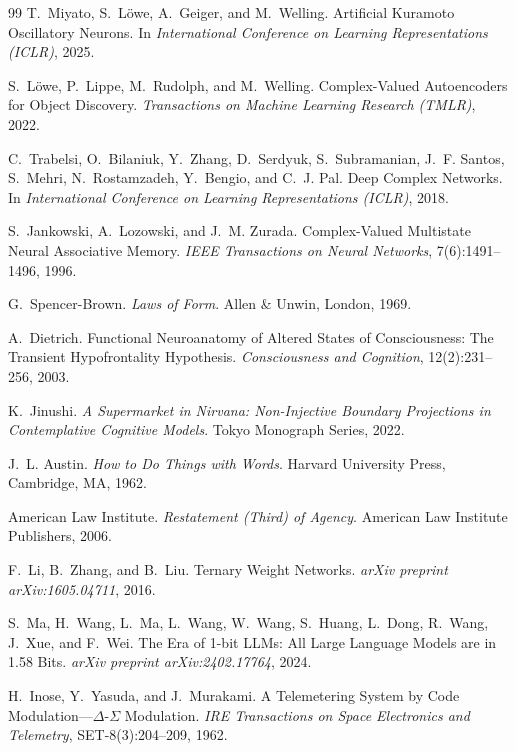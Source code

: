 \documentclass[10pt, twocolumn, a4paper]{article}
\begin{document}
\begin{thebibliography}{99}
T.~Miyato, S.~L{\"o}we, A.~Geiger, and M.~Welling.
\newblock Artificial Kuramoto Oscillatory Neurons.
\newblock In \emph{International Conference on Learning Representations (ICLR)}, 2025.

S.~L{\"o}we, P.~Lippe, M.~Rudolph, and M.~Welling.
\newblock Complex-Valued Autoencoders for Object Discovery.
\newblock \emph{Transactions on Machine Learning Research (TMLR)}, 2022.

C.~Trabelsi, O.~Bilaniuk, Y.~Zhang, D.~Serdyuk, S.~Subramanian, J.~F. Santos, S.~Mehri, N.~Rostamzadeh, Y.~Bengio, and C.~J. Pal.
\newblock Deep Complex Networks.
\newblock In \emph{International Conference on Learning Representations (ICLR)}, 2018.

S.~Jankowski, A.~Lozowski, and J.~M. Zurada.
\newblock Complex-Valued Multistate Neural Associative Memory.
\newblock \emph{IEEE Transactions on Neural Networks}, 7(6):1491--1496, 1996.

G.~Spencer-Brown.
\newblock \emph{Laws of Form}.
\newblock Allen \& Unwin, London, 1969.

A.~Dietrich.
\newblock Functional Neuroanatomy of Altered States of Consciousness: The Transient Hypofrontality Hypothesis.
\newblock \emph{Consciousness and Cognition}, 12(2):231--256, 2003.

K.~Jinushi.
\newblock \emph{A Supermarket in Nirvana: Non-Injective Boundary Projections in Contemplative Cognitive Models}.
\newblock Tokyo Monograph Series, 2022.

J.~L. Austin.
\newblock \emph{How to Do Things with Words}.
\newblock Harvard University Press, Cambridge, MA, 1962.

American Law Institute.
\newblock \emph{Restatement (Third) of Agency}.
\newblock American Law Institute Publishers, 2006.

F.~Li, B.~Zhang, and B.~Liu.
\newblock Ternary Weight Networks.
\newblock \emph{arXiv preprint arXiv:1605.04711}, 2016.

S.~Ma, H.~Wang, L.~Ma, L.~Wang, W.~Wang, S.~Huang, L.~Dong, R.~Wang, J.~Xue, and F.~Wei.
\newblock The Era of 1-bit LLMs: All Large Language Models are in 1.58 Bits.
\newblock \emph{arXiv preprint arXiv:2402.17764}, 2024.

H.~Inose, Y.~Yasuda, and J.~Murakami.
\newblock A Telemetering System by Code Modulation---$\Delta$-$\Sigma$ Modulation.
\newblock \emph{IRE Transactions on Space Electronics and Telemetry}, SET-8(3):204--209, 1962.


\end{thebibliography}
\end{document}
